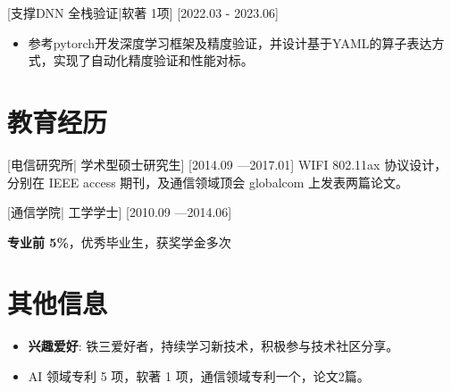 \documentclass{resume}
\begin{document}
[支撑DNN 全栈验证|软著 1项]
[2022.03 - 2023.06]
\begin{itemize}
    \item 参考pytorch开发深度学习框架及精度验证，并设计基于YAML的算子表达方式，实现了自动化精度验证和性能对标。
\end{itemize}

\section{教育经历}
[\textnormal{电信研究所|}  学术型硕士研究生]
[2014.09 —2017.01]
WIFI 802.11ax 协议设计，分别在 IEEE access 期刊，及通信领域顶会 globalcom 上发表两篇论文。

\nocite{*} %



[\textnormal{通信学院|} 工学学士]
[2010.09 —2014.06]

\textbf{专业前 5\%}，优秀毕业生，获奖学金多次

\section{其他信息}
\begin{itemize}
    \item \textbf{兴趣爱好}: 铁三爱好者，持续学习新技术，积极参与技术社区分享。
    \item AI 领域专利 5 项，软著 1 项，通信领域专利一个，论文2篇。
    \printbibliography[heading={none}]
\end{itemize}
\end{document}
